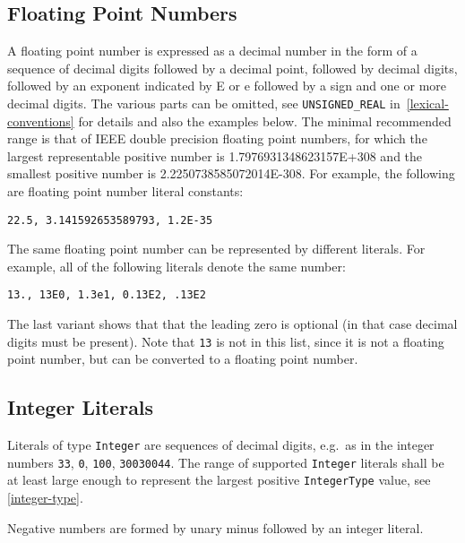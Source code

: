 \subsection{Floating Point Numbers}\label{floating-point-numbers}

A floating point number is expressed as a decimal number in the form of
a sequence of decimal digits followed by a decimal point, followed by decimal digits,
followed by an exponent indicated by E or e followed by a sign
and one or more decimal digits. The various parts can be omitted, see \lstinline!UNSIGNED_REAL! in~\cref{lexical-conventions} for
details and also the examples below. The minimal recommended range is
that of IEEE double precision floating point numbers, for which the
largest representable positive number is 1.7976931348623157E+308 and the
smallest positive number is 2.2250738585072014E-308. For example, the
following are floating point number literal constants:
\begin{lstlisting}[language=modelica]
22.5, 3.141592653589793, 1.2E-35
\end{lstlisting}

The same floating point number can be represented by different literals.
For example, all of the following literals denote the same number:
\begin{lstlisting}[language=modelica]
13., 13E0, 1.3e1, 0.13E2, .13E2
\end{lstlisting}
The last variant shows that that the leading zero is optional (in that case decimal digits must be present).
Note that \lstinline!13! is not in this list, since it is not a floating point number,
but can be converted to a floating point number.

\subsection{Integer Literals}\label{integer-literals}

Literals of type \lstinline!Integer! are sequences of decimal digits, e.g.\ as in the integer numbers \lstinline!33!, \lstinline!0!, \lstinline!100!, \lstinline!30030044!.
The range of supported \lstinline!Integer! literals shall be at least large enough to represent the largest positive \lstinline!IntegerType! value, see \cref{integer-type}.

\begin{nonnormative}
Negative numbers are formed by unary minus followed by an integer literal.
\end{nonnormative}

